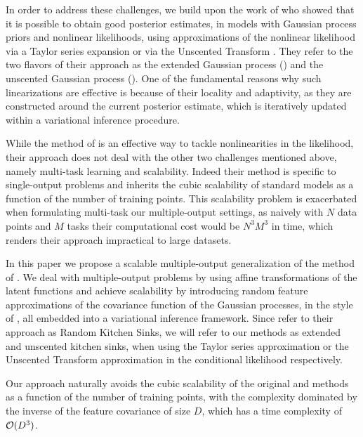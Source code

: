 In order to address these challenges, we build upon the work of  
\citet{steinberg-bonilla-nips-2014} who showed that it is possible to obtain
good posterior estimates, in models with Gaussian process priors and 
nonlinear likelihoods, using  approximations of the nonlinear  likelihood  
via a Taylor series expansion or via the Unscented Transform \citep{Julier2004}. 
They refer to the two  flavors of their approach as the 
extended Gaussian process (\egp) and the unscented Gaussian process (\ugp).
One of the fundamental reasons why such linearizations are effective is 
because of their locality and adaptivity, as they are 
constructed around the current posterior estimate, 
which is iteratively updated within a variational inference procedure.

While the method of \citet{steinberg-bonilla-nips-2014} is an
effective way to tackle nonlinearities in the likelihood, their approach  
does not deal with the other two challenges mentioned above, namely multi-task learning 
and scalability. Indeed their method is specific to single-output problems and 
inherits the cubic scalability of standard \gp models as a function of the number of 
training points. This scalability problem is exacerbated when formulating  multi-task 
our multiple-output settings, as  naively with $N$ data points and $M$ tasks their
computational cost would be $N^3M^3$ in time, 
which renders their approach impractical to large datasets.  

In this paper we propose a scalable multiple-output generalization  
of the method of \citet{steinberg-bonilla-nips-2014}.
We deal with multiple-output problems  by using 
affine transformations of the latent functions and 
achieve scalability by introducing random feature approximations 
 of the covariance function of the Gaussian processes, in the style of 
  \citet{rahimi-recht-nips-2007}, 
 all embedded into a variational inference framework. Since 
\citet{rahimi-recht-nips-2007} refer to their approach as 
Random Kitchen Sinks,  we will refer to our methods 
as extended and unscented kitchen sinks, when using 
the Taylor series approximation or the Unscented Transform approximation 
in the conditional likelihood respectively. 

Our approach naturally avoids the cubic scalability of the 
original \egp and \ugp methods \citep{steinberg-bonilla-nips-2014} as a function of the number 
of training points, with the complexity dominated by 
the inverse of the feature covariance of size $D$, which has a time complexity of
$\mathcal{O}(D^3)$. 

